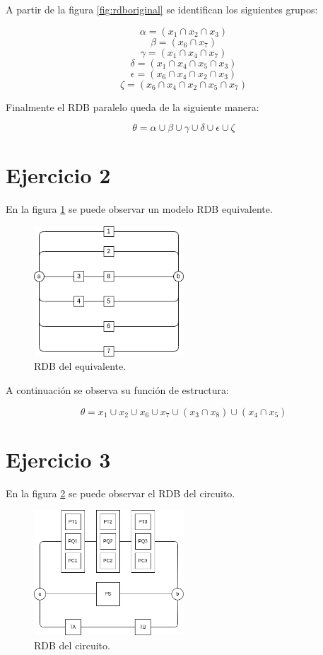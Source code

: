 \documentclass[
    11pt,
    spanish,
    a4paper
]{article}
\begin{document}
A partir de la figura \ref{fig:rdboriginal} se identifican los siguientes grupos:

$$ \alpha = (x_1 \cap x_2 \cap x_3) $$
$$ \beta = (x_6 \cap x_7) $$
$$ \gamma = (x_1 \cap x_4 \cap x_7)$$
$$ \delta = (x_1 \cap x_4 \cap x_5 \cap x_3)$$
$$ \epsilon = (x_6 \cap x_4 \cap x_2 \cap x_3) $$
$$ \zeta = (x_6 \cap x_4 \cap x_2 \cap x_5 \cap x_7)$$

Finalmente el RDB paralelo queda de la siguiente manera:

$$ \theta = \alpha \cup \beta \cup \gamma \cup \delta \cup \epsilon \cup \zeta $$

\newpage

\section{Ejercicio 2}

En la figura \ref{fig:rdbequivalente} se puede observar un modelo RDB equivalente.

\begin{figure}[htbp]
	\centering
	\includegraphics[width=0.5\textwidth]{img/rdb2.png}
	\caption{RDB del equivalente.}
	\label{fig:rdbequivalente}
\end{figure}

A continuación se observa su función de estructura:

$$ \theta = x_1 \cup x_2 \cup x_6 \cup x_7 \cup (x_3 \cap x_8) \cup (x_4 \cap x_5) $$

\newpage

\section{Ejercicio 3}

En la figura \ref{fig:rdbcreado} se puede observar el RDB del circuito.

\begin{figure}[htbp]
	\centering
	\includegraphics[width=0.5\textwidth]{img/rdb3.png}
	\caption{RDB del circuito.}
	\label{fig:rdbcreado}
\end{figure}
\end{document}

